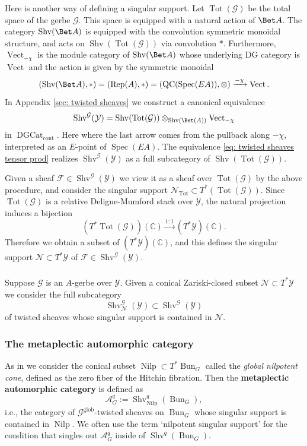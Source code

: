 \documentclass[10pt]{amsart}
\newcommand{\sssec}{\subsubsection}
\theoremstyle{remark}
\newcommand{\C}{\mathbb{C}}
\newcommand{\on}{\operatorname}
\newcommand{\cA}{\mathcal{A}}
\newcommand{\cF}{\mathcal{F}}
\newcommand{\cG}{\mathcal{G}}
\newcommand{\cN}{\mathcal{N}}
\newcommand{\cY}{\mathcal{Y}}
\newcommand{\DGcat}{\on{DGCat}_{\on{cont}}}
\newcommand{\Rep}{\on{Rep}}
\newcommand{\Vect}{\on{Vect}}
\newcommand{\QC}{\on{QC}}
\newcommand{\Shv}{\on{Shv}}
\newcommand{\Nilp}{\on{Nilp}}
\newcommand{\Bun}{\on{Bun}}
\newcommand{\Tot}{\on{Tot}}
\DeclareMathOperator{\Spec}{Spec}
\begin{document}
\sssec{}\label{sssec: sing supp via total space}
Here is another way of defining a singular support. Let $\on{Tot}(\cG)$ be the total space of the gerbe $\cG$. This space is equipped with a natural action of $\Bet A$. The category $\Shv(\Bet A)$ is equipped with the convolution symmetric monoidal structure, and acts on $\Shv(\on{Tot}(\cG))$ via convolution $\ast$. Furthermore, $\Vect_{-\chi}$ is the module category of $\Shv(\Bet A)$ whose underlying DG category is $\Vect$ and the action is given by the symmetric monoidal
\begin{equation}\label{eq: chi eigenfunctor}
    (\Shv(\Bet A),\ast) = (\Rep(A),\ast)=(\QC(\Spec(EA)),\otimes)\xrightarrow{-\chi}\Vect.
\end{equation}
In Appendix \ref{sec: twisted sheaves} we construct a canonical equivalence
\begin{equation}\label{eq: twisted sheaves tensor prod}
    \Shv^{\cG}(\cY)=\Shv(\on{Tot}(\cG))\otimes_{\Shv(\Bet(A))}\Vect_{-\chi}
\end{equation}
    in $\DGcat$. Here 
where the last arrow comes from the pullback along $-\chi$, interpreted as an $E$-point of $\Spec(EA)$. The equivalence \eqref{eq: twisted sheaves tensor prod} realizes $\Shv^{\cG}(\cY)$ as a full subcategory of $\Shv(\on{Tot}(\cG))$.
\medskip

Given a sheaf $\cF\in\Shv^{\cG}(\cY)$ we view it as a sheaf over $\on{Tot}(\cG)$ by the above procedure, and consider the singular support $\cN_{\Tot}\subset T^*(\Tot(\cG))$. Since $\on{Tot}(\cG)$ is a relative Deligne-Mumford stack over $\cY$, the natural projection induces a bijection 
\[(T^*\Tot(\cG))(\C)\xrightarrow{1:1} (T^*\cY)(\C).\]
Therefore we obtain a subset of $(T^*\cY)(\C)$, and this defines the singular support $\cN\subset T^*\cY$ of $\cF\in\Shv^{\cG}(\cY)$.

\sssec{}
Suppose $\cG$ is an $A$-gerbe over $\cY$. Given a conical Zariski-closed subset $\cN\subset T^*\cY$ we consider the full subcategory 
\[\Shv^{\cG}_{\cN}(\cY)\subset \Shv^{\cG}(\cY)\]
of twisted sheaves whose singular support is contained in $\cN$.

\sssec{The metaplectic automorphic category}\label{sssec: AqG}
As in \cite[Sect. 4.2]{BZN} we consider the conical subset $\Nilp \subset T^*\Bun_G$ called the \emph{global nilpotent cone}, defined as the zero fiber of the Hitchin fibration. Then the \textbf{metaplectic automorphic category} is defined as
\[\cA^q_G:=\Shv^q_{\Nilp}(\Bun_G),\]
i.e., the category of $\cG^{\on{glob}}$-twisted sheaves on $\Bun_G$ whose singular support is contained in $\Nilp$. We often use the term `nilpotent singular support' for the condition that singles out $\cA^q_G$ inside of $\Shv^q(\Bun_G)$.
\end{document}
